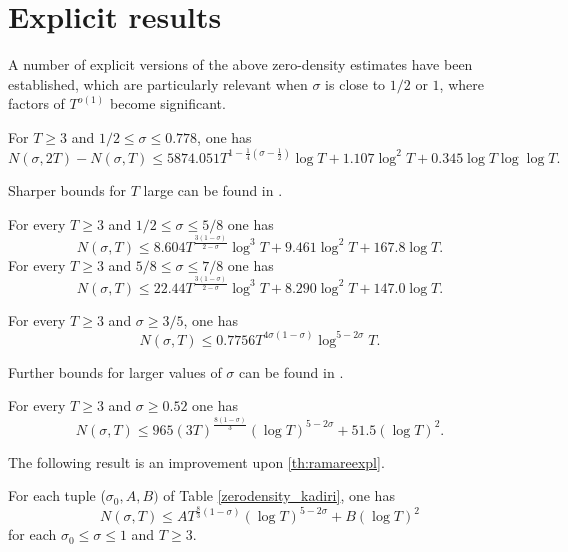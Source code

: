 \section{Explicit results}
A number of explicit versions of the above zero-density estimates have been established, which are particularly relevant when $\sigma$ is close to $1/2$ or $1$, where factors of $T^{o(1)}$ become significant.

\begin{theorem}
For $T \ge 3$ and $1/2 \le \sigma \le 0.778$, one has
$$
N(\sigma, 2 T)-N(\sigma, T) \leq  5874.051 T^{1-\frac{1}{4}\left(\sigma-\frac{1}{2}\right)} \log T+ 1.107 \log ^2 T + 0.345\log T \log \log T.
$$
\end{theorem}
Sharper bounds for $T$ large can be found in \cite{simonic}.

\begin{theorem}For every $T\ge 3 $ and $1/2\le \sigma\le 5/8$ one has
\[
N(\sigma, T) \leq 8.604 T^{\frac{3(1-\sigma)}{2-\sigma}} \log ^3 T+9.461 \log ^2 T+167.8 \log T.
\]
For every $T\ge 3 $ and $5/8\le \sigma\le 7/8$ one has
    \[
    N(\sigma, T) \leq 22.44 T^{\frac{3(1-\sigma)}{2-\sigma}} \log ^3 T+8.290 \log ^2 T+147.0 \log T.
    \]
\end{theorem}

\begin{theorem}For every $T\ge 3$ and $\sigma\ge 3/5$, one has
    \begin{equation*}
N(\sigma, T) \leq 0.7756 T^{4 \sigma(1-\sigma)} \log ^{5-2 \sigma} T.
\end{equation*}
\end{theorem}
Further bounds for larger values of $\sigma$ can be found in \cite{chourasiya_explicit_2024}.

\begin{theorem}\label{th:ramareexpl} For every $T\ge 3$ and $\sigma\ge 0.52$ one has
    \begin{equation*}
N(\sigma, T) \leq 965(3 T)^{\frac{8(1-\sigma)}{3}}(\log T)^{5-2 \sigma}+51.5(\log T)^2.
\end{equation*}
\end{theorem}

The following result is an improvement upon \cref{th:ramareexpl}.
\begin{theorem}\label{th:explicitkln}
For each tuple ($\sigma_0, A, B)$ of Table \ref{zerodensity_kadiri}, one has
\[
N(\sigma, T) \leq AT^{\frac{8}{3}(1-\sigma)}(\log T)^{5-2\sigma} + B(\log T)^2
\]
for each $\sigma_0 \le \sigma \le 1$ and $T \ge 3$.
\end{theorem}

